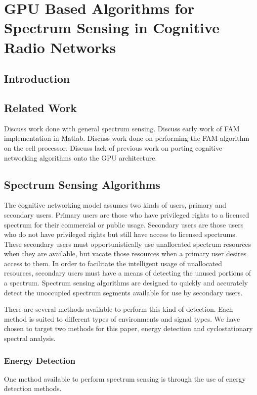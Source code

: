 \chapter{GPU Based Algorithms for Spectrum Sensing in Cognitive Radio Networks}

\section{Introduction}


\section{Related Work}
Discuss work done with general spectrum sensing.
Discuss early work of FAM implementation in Matlab.
Discuss work done on performing the FAM algorithm on the cell processor.
Discuss lack of previous work on porting cognitive networking algorithms onto the GPU architecture.


\section{Spectrum Sensing Algorithms}
The cognitive networking model assumes two kinds of users, primary and secondary users.  Primary users are those who have privileged rights to a licensed spectrum for their commercial or public usage.  Secondary users are those users who do not have privileged rights but still have access to licensed spectrums.  These secondary users must opportunistically use unallocated spectrum resources when they are available, but vacate those resources when a primary user desires access to them.  In order to facilitate the intelligent usage of unallocated resources, secondary users must have a means of detecting the unused portions of a spectrum.  Spectrum sensing algorithms are designed to quickly and accurately detect the unoccupied spectrum segments available for use by secondary users.

There are several methods available to perform this kind of detection.  Each method is suited to different types of environments and signal types.  We have chosen to target two methods for this paper, energy detection and cyclostationary spectral analysis.

\subsection{Energy Detection}
\label{sect:energy_detect}
One method available to perform spectrum sensing is through the use of energy detection methods.

